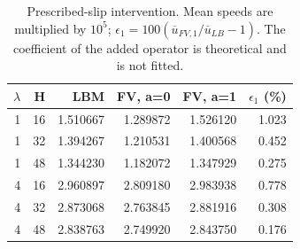 \begin{table}[htbp]\centering\small
\caption{Prescribed-slip intervention. Mean speeds are multiplied by $10^5$; $\epsilon_1=100(\overline u_{FV,1}/\overline u_{LB}-1)$. The coefficient of the added operator is theoretical and is not fitted.}\label{tab:majorintervention}
\begin{tabular}{rrrrrr}\toprule
$\lambda$ & H & LBM & FV, a=0 & FV, a=1 & $\epsilon_1$ (\%)\\\midrule
1 & 16 & 1.510667 & 1.289872 & 1.526120 & 1.023\\
1 & 32 & 1.394267 & 1.210531 & 1.400568 & 0.452\\
1 & 48 & 1.344230 & 1.182072 & 1.347929 & 0.275\\
4 & 16 & 2.960897 & 2.809180 & 2.983938 & 0.778\\
4 & 32 & 2.873068 & 2.763845 & 2.881916 & 0.308\\
4 & 48 & 2.838763 & 2.749920 & 2.843750 & 0.176\\
\bottomrule\end{tabular}\end{table}
